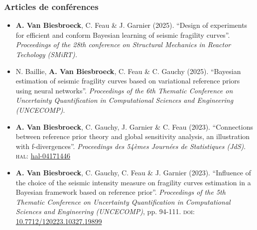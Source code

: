 \subsubsection{Articles de conférences}

\begin{itemize}
    \item \textbf{A. Van Biesbroeck}, C. Feau \& J. Garnier (2025). ``Design of experiments for efficient and conform Bayesian learning of seismic fragility curves''. \emph{Proceedings of the 28th conference on Structural Mechanics in Reactor Techology (SMiRT).}
    \item N. Baillie, \textbf{A. Van Biesbroeck}, C. Feau \& C. Gauchy (2025). ``Bayesian estimation of seismic fragility curves based on variational reference priors using neural networks''. \emph{Proceedings of the 6th Thematic Conference on Uncertainty Quantification in Computational Sciences and Engineering (UNCECOMP)}.
    \item \textbf{A. Van Biesbroeck}, C. Gauchy, J. Garnier \& C. Feau (2023). ``Connections between reference prior theory and global sensitivity analysis, an illustration with f-divergences''. \emph{Proceedings des 54èmes Journées de Statistiques (JdS)}. \textsc{hal:} \href{https://hal.science/hal-04171446}{hal-04171446}
    \item \textbf{A. Van Biesbroeck}, C. Gauchy, C. Feau \& J. Garnier (2023). ``Influence of the choice of the seismic intensity measure on fragility curves estimation in a Bayesian framework based on reference prior''. \emph{Proceedings of the 5th Thematic Conference on Uncertainty Quantification in Computational Sciences and Engineering (UNCECOMP)}, pp. 94-111. \textsc{doi:} \href{https://dx.doi.org/10.7712/120223.10327.19899}{10.7712/120223.10327.19899}
\end{itemize}





















